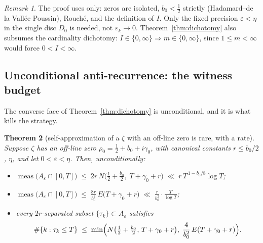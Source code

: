 \documentclass[11pt]{amsart}
\theoremstyle{plain}
\newtheorem{theorem}{Theorem}[section]
\theoremstyle{definition}
\theoremstyle{remark}
\newtheorem{remark}[theorem]{Remark}
\newcommand{\meas}{\operatorname{meas}}
\begin{document}
\begin{remark}
The proof uses only: zeros are isolated, $b_0<\tfrac12$ strictly (Hadamard--de la Vall\'ee Poussin), Rouch\'e, and the definition of $I$. Only the fixed precision $\varepsilon<\eta$ in the single disc $D_0$ is needed, not $\varepsilon_k\to0$. Theorem~\ref{thm:dichotomy} also subsumes the cardinality dichotomy: $I\in\{0,\infty\}\Rightarrow m\in\{0,\infty\}$, since $1\le m<\infty$ would force $0<I<\infty$.
\end{remark}

\subsection{Unconditional anti-recurrence: the witness budget}

The converse face of Theorem~\ref{thm:dichotomy} is unconditional, and it is what kills the strategy.

\begin{theorem}[self-approximation of a $\zeta$ with an off-line zero is rare, with a rate]\label{thm:witnesses}
Suppose $\zeta$ has an off-line zero $\rho_0=\tfrac12+b_0+i\gamma_0$, with canonical constants $r\le b_0/2$, $\eta$, and let $0<\varepsilon<\eta$. Then, unconditionally:
\begin{itemize}
\item[\textup{(i)}] $\displaystyle \meas\bigl(A_\varepsilon\cap[0,T]\bigr)\;\le\;2r\,N\bigl(\tfrac12+\tfrac{b_0}2,\;T+\gamma_0+r\bigr)\;\ll\;r\,T^{\,1-b_0/8}\log T$;
\item[\textup{(ii)}] $\displaystyle \meas\bigl(A_\varepsilon\cap[0,T]\bigr)\;\le\;\frac{8r}{b_0^2}\,E\bigl(T+\gamma_0+r\bigr)\;\ll\;\frac{r}{b_0^2}\cdot\frac{T}{\log T}$;
\item[\textup{(iii)}] every $2r$-separated subset $\{\tau_k\}\subset A_\varepsilon$ satisfies
\[
\#\{k:\tau_k\le T\}\;\le\;\min\Bigl(N\bigl(\tfrac12+\tfrac{b_0}2,\,T+\gamma_0+r\bigr),\;\frac{4}{b_0^2}\,E(T+\gamma_0+r)\Bigr).
\]
\end{itemize}
\end{theorem}
\end{document}
